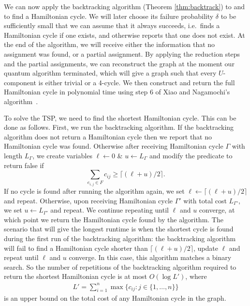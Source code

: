 We can now apply the backtracking algorithm (Theorem \ref{thm:backtrack}) to \FnPredicatethree and \FnHeuristicthree to find a Hamiltonian cycle. We will later choose its failure probability $\delta$ to be sufficiently small that we can assume that it always succeeds, i.e.\ finds a Hamiltonian cycle if one exists, and otherwise reports that one does not exist. At the end of the algorithm, we will receive either the information that no assignment was found, or a partial assignment. By applying the reduction steps and the partial assignments, we can reconstruct the graph at the moment our quantum algorithm terminated, which will give a graph such that every $U$-component is either trivial or a 4-cycle. We then construct and return the full Hamiltonian cycle in polynomial time using step $6$ of Xiao and Nagamochi's algorithm~\cite{xiao2016degree3}. %

To solve the TSP, we need to find the shortest Hamiltonian cycle. This can be done as follows. First, we run the backtracking algorithm. If the backtracking algorithm does not return a Hamiltonian cycle then we report that no Hamiltonian cycle was found. Otherwise after receiving Hamiltonian cycle $\Gamma$ with length $L_\Gamma$, we create variables $\ell \leftarrow 0$ \& $u \leftarrow L_\Gamma$ and modify the predicate to return false if
%
\begin{equation}
\sum_{e_{i,j}\in F}c_{ij} \geq \lceil(\ell + u)/2\rceil.
\end{equation}
%
If no cycle is found after running the algorithm again, we set $\ell \leftarrow \lceil(\ell + u)/2\rceil$ and repeat. Otherwise, upon receiving Hamiltonian cycle $\Gamma'$ with total cost $L_{\Gamma'}$, we set $u \leftarrow L_{\Gamma'}$ and repeat. We continue repeating until $\ell$ and $u$ converge, at which point we return the Hamiltonian cycle found by the algorithm. The scenario that will give the longest runtime is when the shortest cycle is found during the first run of the backtracking algorithm: the backtracking algorithm will fail to find a Hamiltonian cycle shorter than $\lceil(\ell + u)/2\rceil$, update $\ell$ and repeat until $\ell$ and $u$ converge. In this case, this algorithm matches a binary search. So the number of repetitions of the backtracking algorithm required to return the shortest Hamiltonian cycle is at most $O(\log L')$, where
%
%
\begin{align}
L' = \sum_{i = 1}^{n}\max \{c_{ij} : j \in \{1,\dots,n\} \}
\label{eqn:l}
\end{align}
%
is an upper bound on the total cost of any Hamiltonian cycle in the graph.

